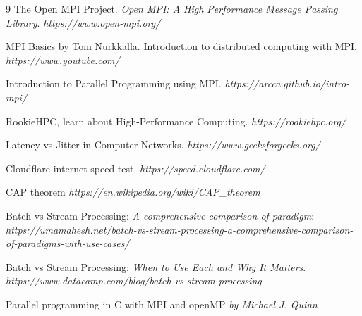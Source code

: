 \documentclass[
	a4paper,
	10pt,
	unnumberedsections,
	twoside, 
]{LTJournalArticle}
\begin{document}
\begin{thebibliography}{9}
	The Open MPI Project. \textit{Open MPI: A High Performance Message Passing Library}. \textit{https://www.open-mpi.org/}
	
	 MPI Basics by Tom Nurkkalla. Introduction to distributed computing with MPI. \textit{https://www.youtube.com/}
	
	 Introduction to Parallel Programming using MPI. \textit{https://arcca.github.io/intro-mpi/}
	
	 RookieHPC, learn about High-Performance Computing. \textit{https://rookiehpc.org/}
	
	 Latency vs Jitter in Computer Networks. \textit{https://www.geeksforgeeks.org/}
	
	Cloudflare internet speed test. \textit{https://speed.cloudflare.com/}
	
	CAP theorem \textit{https://en.wikipedia.org/wiki/CAP\_theorem}
	
	Batch vs Stream Processing: \textit{A comprehensive comparison of paradigm}: \textit{https://umamahesh.net/batch-vs-stream-processing-a-comprehensive-comparison-of-paradigms-with-use-cases/}
	
	Batch vs Stream Processing: \textit{When to Use Each and Why It Matters}. \textit{https://www.datacamp.com/blog/batch-vs-stream-processing}
	
	Parallel programming in C with MPI and openMP \textit{by Michael J. Quinn}
	
\end{thebibliography}

\printbibliography %

\end{document}
